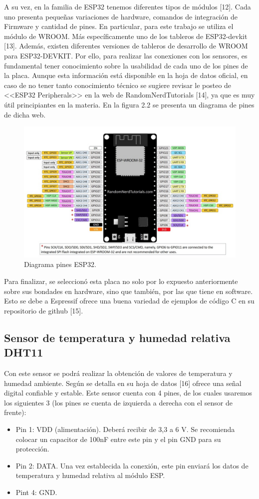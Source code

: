 A su vez, en la familia de ESP32 tenemos diferentes tipos de módulos [12]. Cada uno presenta pequeñas variaciones de hardware, comandos de integración de Firmware y cantidad de pines. En particular, para este trabajo se utiliza el módulo de WROOM. Más específicamente uno de los tableros de ESP32-devkit [13]. Además, existen diferentes versiones de tableros de desarrollo de WROOM para ESP32-DEVKIT. Por ello, para realizar las conexiones con los sensores, es fundamental tener conocimiento sobre la usabilidad de cada uno de los pines de la placa. Aunque esta información está disponible en la hoja de datos oficial, en caso de no tener tanto conocimiento técnico se sugiere revisar le posteo de <<ESP32 Peripherals>> en la web de RandomNerdTutorials [14], ya que es muy útil principiantes en la materia. En la figura 2.2 se presenta un diagrama de pines de dicha web.

\begin{figure}[htpb]
\centering 
\includegraphics[width=.9\textwidth]{./Figures/esp32pines.png}
\caption{Diagrama pines ESP32.}
\label{fig:diagBloques}
\end{figure}

Para finalizar, se seleccionó esta placa no solo por lo expuesto anteriormente sobre sus bondades en hardware, sino que también, por las que tiene en software. Esto se debe a Espressif ofrece una buena variedad de ejemplos de código C en su repositorio de github [15].

\subsection{Sensor de temperatura y humedad relativa DHT11}
Con este sensor se podrá realizar la obtención de valores de temperatura y humedad ambiente. Según se detalla en su hoja de datos [16] ofrece una señal digital confiable y estable.
Este sensor cuenta con 4 pines, de los cuales usaremos los siguientes 3 (los pines se cuenta de izquierda a derecha con el sensor de frente):
\begin{itemize}
\item Pin 1: VDD (alimentación). Deberá recibir de 3,3 a 6 V. Se recomienda colocar un capacitor de 100nF entre este pin y el pin GND para su protección.
\item Pin 2: DATA. Una vez establecida la conexión, este pin enviará los datos de temperatura y humedad relativa al módulo ESP.
\item Pint 4: GND.
\end{itemize}

